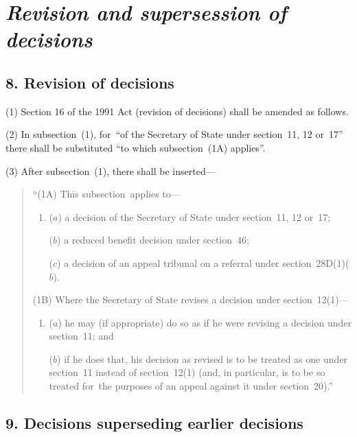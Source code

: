\documentclass[12pt,a4paper]{article}
\begin{document}

\section{\itshape Revision and supersession of decisions}

\subsection{8. Revision of decisions}

(1) Section 16 of the 1991 Act (revision of decisions) shall be amended as follows.

(2) In subsection~(1), for~“of the Secretary of State under section~11, 12 or~17” there shall be substituted “to which subsection~(1A)  applies”.

(3) After subsection~(1), there shall be inserted—
\begin{quotation}
“(1A) This subsection~applies to—
\begin{enumerate}\item[]
($a$) a decision of the Secretary of State under section~11, 12 or~17;

($b$) a reduced benefit decision under section~46;

($c$) a decision of an appeal tribunal on a referral under section~28D(1)($b$).
\end{enumerate}

(1B) Where the Secretary of State revises a decision under section~12(1)—
\begin{enumerate}\item[]
($a$) he may (if appropriate) do so as if he were revising a decision under section~11; and

($b$) if he does that, his decision as revised is to be treated as one under section~11 instead of section~12(1)  (and, in particular, is to be so treated for~the purposes of an appeal against it under section~20).”
\end{enumerate}
\end{quotation}


\subsection{9. Decisions superseding earlier decisions}
\end{document}
